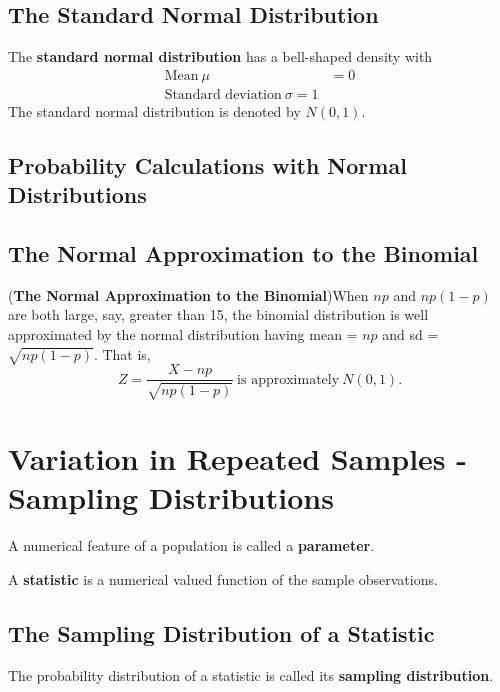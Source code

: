 \documentclass[12pt,openany]{book}
\theoremstyle{definition}
\begin{document}
	\subsection{The Standard Normal Distribution}
	
	\begin{tcolorbox}[colback=white]
		The \textbf{standard normal distribution} has a bell-shaped density with \begin{align*}
			\text{Mean}\ \mu &= 0 \\
			\text{Standard deviation}\ \sigma = 1
		\end{align*} The standard normal distribution is denoted by $N(0,1)$.
	\end{tcolorbox}
	
	
	\subsection{Probability Calculations with Normal Distributions}
	
	\subsection{The Normal Approximation to the Binomial}
	
	\begin{tcolorbox}[colback=white]
		(\textbf{The Normal Approximation to the Binomial})\quad When $np$ and $np(1-p)$ are both large, say, greater than 15, the binomial distribution is well approximated by the normal distribution having mean = $np$ and sd = $\sqrt{np(1-p)}$. That is, \[
		Z=\frac{X-np}{\sqrt{np(1-p)}}\ \text{is approximately}\ N(0,1).
		\]
	\end{tcolorbox}
	
	
	\section{Variation in Repeated Samples - Sampling Distributions}
	
	\begin{tcolorbox}[colback=white]
		A numerical feature of a population is called a \textbf{parameter}.
	\end{tcolorbox}
	\begin{tcolorbox}[colback=white]
		A \textbf{statistic} is a numerical valued function of the sample observations.
	\end{tcolorbox}
	
	\subsection{The Sampling Distribution of a Statistic}
	\begin{tcolorbox}[colback=white]
		The probability distribution of a statistic is called its \textbf{sampling distribution}.
	\end{tcolorbox}
	
\end{document}
